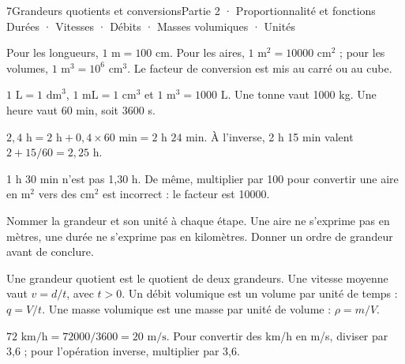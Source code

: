 \begin{ouverture}[courbe]{7}{Grandeurs quotients et conversions}{Partie 2 · Proportionnalité et fonctions}
{Durées · Vitesses · Débits · Masses volumiques · Unités}
\end{ouverture}
\pagestyle{otMain}\essentiel\fontsize{11}{15}\selectfont
{}
\begin{propriete}Pour les longueurs, $1\text{ m}=100\text{ cm}$. Pour les aires, $1\text{ m}^2=10000\text{ cm}^2$ ; pour les volumes, $1\text{ m}^3=10^6\text{ cm}^3$. Le facteur de conversion est mis au carré ou au cube.\end{propriete}
\begin{propriete}$1\text{ L}=1\text{ dm}^3$, $1\text{ mL}=1\text{ cm}^3$ et $1\text{ m}^3=1000\text{ L}$. Une tonne vaut 1000 kg. Une heure vaut 60 min, soit 3600 s.\end{propriete}
\begin{exemple}$2{,}4\text{ h}=2\text{ h}+0{,}4\times60\text{ min}=2\text{ h }24\text{ min}$. À l’inverse, 2 h 15 min valent $2+15/60=2{,}25$ h.\end{exemple}
\begin{attention}1 h 30 min n’est pas 1,30 h. De même, multiplier par 100 pour convertir une aire en m$^2$ vers des cm$^2$ est incorrect : le facteur est 10000.\end{attention}
\begin{savoirfaire}Nommer la grandeur et son unité à chaque étape. Une aire ne s’exprime pas en mètres, une durée ne s’exprime pas en kilomètres. Donner un ordre de grandeur avant de conclure.\end{savoirfaire}
\clearpage
{}
\begin{definition}Une grandeur quotient est le quotient de deux grandeurs. Une vitesse moyenne vaut $v=d/t$, avec $t>0$. Un débit volumique est un volume par unité de temps : $q=V/t$. Une masse volumique est une masse par unité de volume : $\rho=m/V$.\end{definition}
\begin{exemple}$72\text{ km/h}=72000/3600=20\text{ m/s}$. Pour convertir des km/h en m/s, diviser par 3,6 ; pour l’opération inverse, multiplier par 3,6.\end{exemple}
